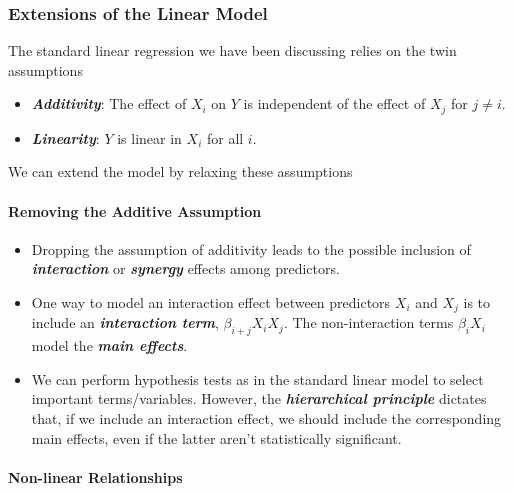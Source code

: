 \documentclass[11pt]{article}
\providecommand{\tightlist}{%
      \setlength{\itemsep}{0pt}\setlength{\parskip}{0pt}}
\begin{document}
    \hypertarget{extensions-of-the-linear-model}{%
\subsubsection{Extensions of the Linear
Model}\label{extensions-of-the-linear-model}}

    The standard linear regression we have been discussing relies on the
twin assumptions

\begin{itemize}
\tightlist
\item
  \textbf{\emph{Additivity}}: The effect of \(X_i\) on \(Y\) is
  independent of the effect of \(X_j\) for \(j\neq i\).
\item
  \textbf{\emph{Linearity}}: \(Y\) is linear in \(X_i\) for all \(i\).
\end{itemize}

We can extend the model by relaxing these assumptions

    \hypertarget{removing-the-additive-assumption}{%
\paragraph{Removing the Additive
Assumption}\label{removing-the-additive-assumption}}

    \begin{itemize}
\item
  Dropping the assumption of additivity leads to the possible inclusion
  of \textbf{\emph{interaction}} or \textbf{\emph{synergy}} effects
  among predictors.
\item
  One way to model an interaction effect between predictors \(X_i\) and
  \(X_j\) is to include an \textbf{\emph{interaction term}},
  \(\beta_{i + j}X_iX_j\). The non-interaction terms \(\beta_i X_i\)
  model the \textbf{\emph{main effects}}.
\item
  We can perform hypothesis tests as in the standard linear model to
  select important terms/variables. However, the
  \textbf{\emph{hierarchical principle}} dictates that, if we include an
  interaction effect, we should include the corresponding main effects,
  even if the latter aren't statistically significant.
\end{itemize}

    \hypertarget{non-linear-relationships}{%
\paragraph{Non-linear Relationships}\label{non-linear-relationships}}
\end{document}
